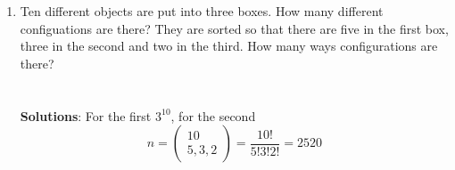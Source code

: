 \documentclass[11pt,a4paper]{scrartcl}
\begin{document}
\begin{enumerate}
\item Ten different objects are put into three boxes. How many different configuations are there? They are sorted so that there are five in the first box, three in the second and two in the third. How many ways configurations are there?\\ \\ \\
  \textbf{Solutions}: For the first $3^{10}$, for the second
  \begin{equation}
    n=\left(\begin{array}{c}10\\5,3,2\end{array}\right)=\frac{10!}{5!3!2!}=2520
  \end{equation}
  
  
\end{enumerate}
  
\end{document}
